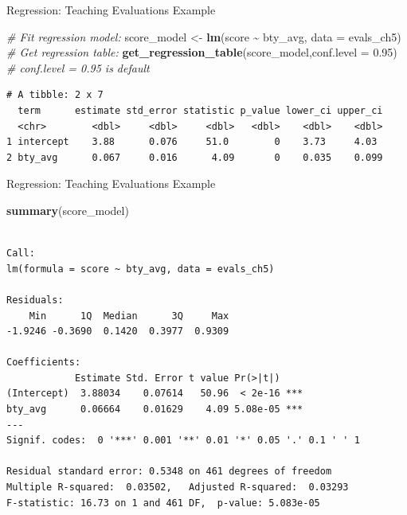 \documentclass[
  ignorenonframetext,
]{beamer}
\newenvironment{Shaded}{\begin{snugshade}}{\end{snugshade}}
\newcommand{\AttributeTok}[1]{\textcolor[rgb]{0.13,0.29,0.53}{#1}}
\newcommand{\CommentTok}[1]{\textcolor[rgb]{0.56,0.35,0.01}{\textit{#1}}}
\newcommand{\FloatTok}[1]{\textcolor[rgb]{0.00,0.00,0.81}{#1}}
\newcommand{\FunctionTok}[1]{\textcolor[rgb]{0.13,0.29,0.53}{\textbf{#1}}}
\newcommand{\NormalTok}[1]{#1}
\newcommand{\OtherTok}[1]{\textcolor[rgb]{0.56,0.35,0.01}{#1}}
\newcommand{\SpecialCharTok}[1]{\textcolor[rgb]{0.81,0.36,0.00}{\textbf{#1}}}
\begin{document}
\begin{frame}[fragile]{Regression: Teaching Evaluations Example}
\protect\hypertarget{regression-teaching-evaluations-example-6}{}
\tiny

\begin{Shaded}
\begin{Highlighting}[]
\CommentTok{\# Fit regression model:}
\NormalTok{score\_model }\OtherTok{\textless{}{-}} \FunctionTok{lm}\NormalTok{(score }\SpecialCharTok{\textasciitilde{}}\NormalTok{ bty\_avg, }\AttributeTok{data =}\NormalTok{ evals\_ch5)}
\CommentTok{\# Get regression table:}
\FunctionTok{get\_regression\_table}\NormalTok{(score\_model,}\AttributeTok{conf.level =} \FloatTok{0.95}\NormalTok{) }\CommentTok{\# conf.level = 0.95 is default}
\end{Highlighting}
\end{Shaded}

\begin{verbatim}
# A tibble: 2 x 7
  term      estimate std_error statistic p_value lower_ci upper_ci
  <chr>        <dbl>     <dbl>     <dbl>   <dbl>    <dbl>    <dbl>
1 intercept    3.88      0.076     51.0        0    3.73     4.03 
2 bty_avg      0.067     0.016      4.09       0    0.035    0.099
\end{verbatim}

\normalsize
\end{frame}

\begin{frame}[fragile]{Regression: Teaching Evaluations Example}
\protect\hypertarget{regression-teaching-evaluations-example-7}{}
\tiny

\begin{Shaded}
\begin{Highlighting}[]
\FunctionTok{summary}\NormalTok{(score\_model)}
\end{Highlighting}
\end{Shaded}

\begin{verbatim}

Call:
lm(formula = score ~ bty_avg, data = evals_ch5)

Residuals:
    Min      1Q  Median      3Q     Max 
-1.9246 -0.3690  0.1420  0.3977  0.9309 

Coefficients:
            Estimate Std. Error t value Pr(>|t|)    
(Intercept)  3.88034    0.07614   50.96  < 2e-16 ***
bty_avg      0.06664    0.01629    4.09 5.08e-05 ***
---
Signif. codes:  0 '***' 0.001 '**' 0.01 '*' 0.05 '.' 0.1 ' ' 1

Residual standard error: 0.5348 on 461 degrees of freedom
Multiple R-squared:  0.03502,   Adjusted R-squared:  0.03293 
F-statistic: 16.73 on 1 and 461 DF,  p-value: 5.083e-05
\end{verbatim}

\normalsize
\end{frame}
\end{document}
